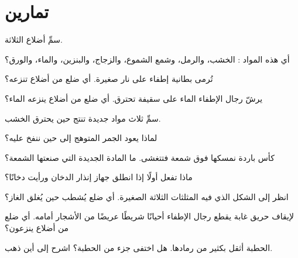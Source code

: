 \section{تمارين}

\begin{exercise}[$\star$]\label{exo:g4:what-a-fire-needs:1}
سمِّ أضلاع  الثلاثة.
\end{exercise}

\begin{exercise}[$\star$]\label{exo:g4:what-a-fire-needs:2}
أي هذه المواد : الخشب، والرمل، وشمع الشموع، والزجاج، والبنزين،
والماء، والورق؟
\end{exercise}

\begin{exercise}[$\star$]\label{exo:g4:what-a-fire-needs:3}
تُرمى بطانية إطفاء على نار صغيرة. أي ضلع من أضلاع 
تنزعه؟
\end{exercise}

\begin{exercise}[$\star$]\label{exo:g4:what-a-fire-needs:4}
يرشّ رجال الإطفاء الماء على سقيفة تحترق. أي ضلع من أضلاع 
ينزعه الماء؟
\end{exercise}

\begin{exercise}[$\star$]\label{exo:g4:what-a-fire-needs:5}
سمِّ ثلاث مواد جديدة تنتج حين يحترق الخشب.
\end{exercise}

\begin{exercise}[$\star$]\label{exo:g4:what-a-fire-needs:6}
لماذا يعود الجمر المتوهج إلى  حين ننفخ عليه؟
\end{exercise}

\begin{exercise}[$\star$]\label{exo:g4:what-a-fire-needs:7}
كأس باردة نمسكها فوق شمعة فتتغشى. ما المادة الجديدة التي صنعتها
الشمعة؟
\end{exercise}

\begin{exercise}[$\star$]\label{exo:g4:what-a-fire-needs:8}
ماذا تفعل أولًا إذا انطلق جهاز إنذار الدخان ورأيت دخانًا؟
\end{exercise}

\begin{exercise}[$\star$]\label{exo:g4:what-a-fire-needs:9}
انظر إلى الشكل الذي فيه المثلثات الثلاثة الصغيرة. أي ضلع يُشطب حين
يُغلق الغاز؟
\end{exercise}

\begin{exercise}[$\star\star$]\label{exo:g4:what-a-fire-needs:10}
لإيقاف حريق غابة يقطع رجال الإطفاء أحيانًا شريطًا عريضًا من الأشجار أمامه.
أي ضلع من أضلاع 
ينزعون؟
\end{exercise}

\begin{exercise}[$\star\star$]\label{exo:g4:what-a-fire-needs:11}
الحطبة أثقل بكثير من رمادها. هل اختفى جزء من الحطبة؟ اشرح إلى
أين ذهب.
\end{exercise}
